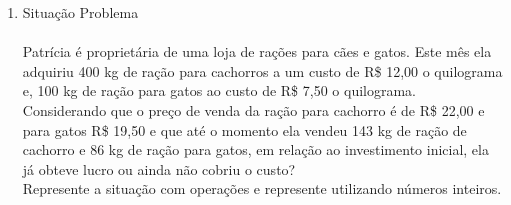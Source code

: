 \documentclass[a4paper,14pt]{article}
\begin{document}
\begin{multicols}{2}
\begin{enumerate}
			\newpage
			
			\item Situação Problema \\\\
			Patrícia é proprietária de uma loja de rações para cães e gatos. Este mês ela adquiriu 400 kg de ração para cachorros a um custo de R\$ 12,00 o quilograma e, 100 kg de ração para gatos ao custo de R\$ 7,50 o quilograma. Considerando que o preço de venda da ração para cachorro é de R\$ 22,00 e para gatos R\$ 19,50 e que até o momento ela vendeu 143 kg de ração de cachorro e 86 kg de ração para gatos, em relação ao investimento inicial, ela já obteve lucro ou ainda não cobriu o custo? \\
			
			Represente a situação com operações e represente utilizando números inteiros. \\
			
			\newpage
			

\end{enumerate}
\end{multicols}
\end{document}

